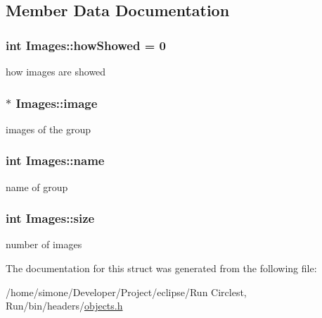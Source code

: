 \subsection{Member Data Documentation}
\hypertarget{struct_images_a6904c7d8163adb2cc2a841f725875de9}{
\subsubsection[{how\-Showed}]{\setlength{\rightskip}{0pt plus 5cm}int Images\-::how\-Showed = 0}}\label{struct_images_a6904c7d8163adb2cc2a841f725875de9}
how images are showed \hypertarget{struct_images_ac66f81236ef2f8c420fb5a5c79a76997}{
\subsubsection[{image}]{$\ast$ Images\-::image}}\label{struct_images_ac66f81236ef2f8c420fb5a5c79a76997}
images of the group \hypertarget{struct_images_a269ac7a7104440dfd4a9dc8e94b81491}{
\subsubsection[{name}]{\setlength{\rightskip}{0pt plus 5cm}int Images\-::name}}\label{struct_images_a269ac7a7104440dfd4a9dc8e94b81491}
name of group \hypertarget{struct_images_a9f51a012085149e8102280a76b10bab4}{
\subsubsection[{size}]{\setlength{\rightskip}{0pt plus 5cm}int Images\-::size}}\label{struct_images_a9f51a012085149e8102280a76b10bab4}
number of images 

The documentation for this struct was generated from the following file\-:\begin{DoxyCompactItemize}
\item 
/home/simone/\-Developer/\-Project/eclipse/\-Run Circlest, Run/bin/headers/\hyperlink{objects_8h}{objects.\-h}\end{DoxyCompactItemize}
